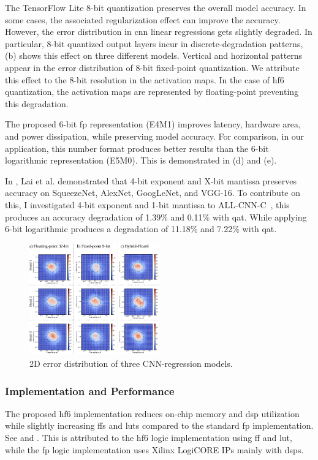 The TensorFlow Lite 8-bit quantization preserves the overall model accuracy. In some cases, the associated regularization effect can improve the accuracy. However, the error distribution in \gls{cnn} linear regressions gets slightly degraded. In particular, 8-bit quantized output layers incur in discrete-degradation patterns, (b) shows this effect on three different models. Vertical and horizontal patterns appear in the error distribution of 8-bit fixed-point quantization. We attribute this effect to the 8-bit resolution in the activation maps. In the case of \gls{hf6} quantization, the activation maps are represented by floating-point preventing this degradation.

The proposed 6-bit \gls{fp} representation (E4M1) improves latency, hardware area, and power dissipation, while preserving model accuracy. For comparison, in our application, this number format produces better results than the 6-bit logarithmic representation (E5M0). This is demonstrated in (d) and (e).

In \cite{lai2017deep}, Lai et al. demonstrated that 4-bit exponent and X-bit mantissa preserves accuracy on SqueezeNet, AlexNet, GoogLeNet, and VGG-16. To contribute on this, I investigated 4-bit exponent and 1-bit mantissa to ALL-CNN-C~\cite{springenberg2014striving}, this produces an accuracy degradation of 1.39\% and 0.11\% with \gls{qat}. While applying 6-bit logarithmic produces a degradation of 11.18\% and 7.22\% with \gls{qat}.

\begin{figure}[t!]
	\centering
	\includegraphics[width=0.5\textwidth]{./chapters/cnn_accelerator/figures/histograms/2D_error_distribtion.pdf}
	\caption{2D error distribution of three CNN-regression models.}
	\label{fig:2d_error_distribtion}
\end{figure}

\subsubsection{Implementation and Performance}
The proposed \gls{hf6} implementation reduces on-chip memory and \gls{dsp} utilization while slightly increasing \glspl{ff} and \glspl{lut} compared to the standard \gls{fp} implementation. See  and . This is attributed to the \gls{hf6} logic implementation using \gls{ff} and \gls{lut}, while the \gls{fp} logic implementation uses Xilinx LogiCORE IPs mainly with \glspl{dsp}.

